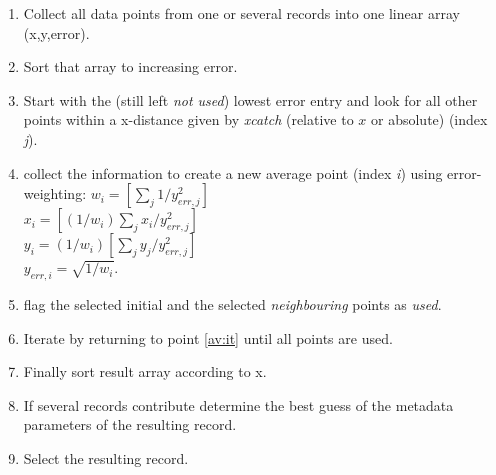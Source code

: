 \documentclass[11pt,fleqn]{book} %
\begin{document}



\begin{enumerate}
\item Collect all data points from one or several records into one linear array (x,y,error).
\item Sort that array to increasing error.
\item \label{av:it} Start with the (still left \emph{not used}) lowest error entry 
and look for all other points within 
a x-distance given by \emph{xcatch} (relative to ${x}$ or absolute) (index \emph{j}).
\item collect the information to create a new average point (index \emph{i}) using error-weighting:
${w_i=[ \sum_j {1/y_{err,j}^2}]}$ \\
${x_i=[(1/w_i) \sum_j {x_i/y_{err,j}^2}]}$ \\
${y_i=(1/w_i)[\sum_j {y_j/y_{err,j}^2}]}$ \\
${y_{err,i} = \sqrt{1/w_i}}$.
\item flag the selected initial and the selected \emph{neighbouring} points as \emph{used}.
\item Iterate by returning to point \ref{av:it} until all points are used.
\item Finally sort result array according to x.
\item If several records contribute determine the best guess of the metadata parameters of
the resulting record.
\item Select the resulting record.

\end{enumerate}
\end{document}
